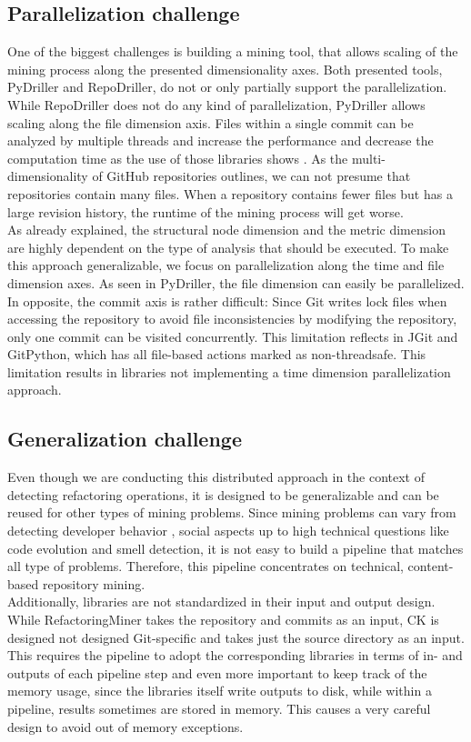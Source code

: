 \documentclass[conference]{IEEEtran}
\begin{document}
\subsection{Parallelization challenge}
One of the biggest challenges is building a mining tool, that allows scaling of the mining process along the presented dimensionality axes. Both presented tools, PyDriller and RepoDriller, do not or only partially support the parallelization. While RepoDriller does not do any kind of parallelization, PyDriller allows scaling along the file dimension axis. Files within a single commit can be analyzed by multiple threads and increase the performance and decrease the computation time as the use of those libraries shows \cite{Gote2019}. As the multi-dimensionality of GitHub repositories outlines, we can not presume that repositories contain many files. When a repository contains fewer files but has a large revision history, the runtime of the mining process will get worse.\\
As already explained, the structural node dimension and the metric dimension are highly dependent on the type of analysis that should be executed. To make this approach generalizable, we focus on parallelization along the time and file dimension axes. As seen in PyDriller, the file dimension can easily be parallelized. In opposite, the commit axis is rather difficult: Since Git writes lock files when accessing the repository to avoid file inconsistencies by modifying the repository, only one commit can be visited concurrently. This limitation reflects in JGit and GitPython, which has all file-based actions marked as non-threadsafe. This limitation results in libraries not implementing a time dimension parallelization approach.

\subsection{Generalization challenge}
Even though we are conducting this distributed approach in the context of detecting refactoring operations, it is designed to be generalizable and can be reused for other types of mining problems. Since mining problems can vary from detecting developer behavior \cite{}, social aspects \cite{} up to high technical questions like code evolution \cite{} and smell detection\cite{}, it is not easy to build a pipeline that matches all type of problems. Therefore, this pipeline concentrates on technical, content-based repository mining.\\
Additionally, libraries are not standardized in their input and output design. While RefactoringMiner takes the repository and commits as an input, CK is designed not designed Git-specific and takes just the source directory as an input. This requires the pipeline to adopt the corresponding libraries in terms of in- and outputs of each pipeline step and even more important to keep track of the memory usage, since the libraries itself write outputs to disk, while within a pipeline, results sometimes are stored in memory. This causes a very careful design to avoid out of memory exceptions.
\end{document}
